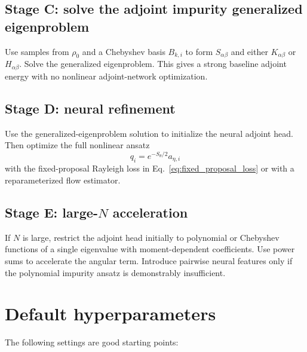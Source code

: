 \documentclass[11pt]{article}
\begin{document}
\subsection{Stage C: solve the adjoint impurity generalized eigenproblem}

Use samples from $\rho_0$ and a Chebyshev basis $B_{k,i}$ to form $S_{\alpha\beta}$ and either $K_{\alpha\beta}$ or $H_{\alpha\beta}$.  Solve the generalized eigenproblem.  This gives a strong baseline adjoint energy with no nonlinear adjoint-network optimization.

\subsection{Stage D: neural refinement}

Use the generalized-eigenproblem solution to initialize the neural adjoint head.  Then optimize the full nonlinear ansatz
\begin{equation}
q_i=e^{-S_\theta/2}a_{\eta,i}
\end{equation}
with the fixed-proposal Rayleigh loss in Eq.~\eqref{eq:fixed_proposal_loss} or with a reparameterized flow estimator.

\subsection{Stage E: large-$N$ acceleration}

If $N$ is large, restrict the adjoint head initially to polynomial or Chebyshev functions of a single eigenvalue with moment-dependent coefficients.  Use power sums to accelerate the angular term.  Introduce pairwise neural features only if the polynomial impurity ansatz is demonstrably insufficient.

\section{Default hyperparameters}

The following settings are good starting points:
\end{document}
